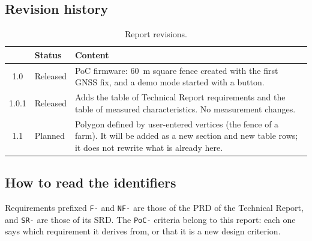 \subsection{Revision history}

\begin{table}[H]
\centering
\small
\begin{tabularx}{\textwidth}{|c l X|}
\hline
\tablehead{\textbf{Rev.} & \textbf{Status} & \textbf{Content}} \\ \hline
1.0 & Released & PoC firmware: 60~m square fence created with the first GNSS fix, and a demo mode started with a button. \\ \hline
1.0.1 & Released & Adds the table of Technical Report requirements and the table of measured characteristics. No measurement changes. \\ \hline
1.1 & Planned & Polygon defined by user-entered vertices (the fence of a farm). It will be added as a new section and new table rows; it does not rewrite what is already here. \\ \hline
\end{tabularx}
\caption{Report revisions.}
\end{table}

\subsection{How to read the identifiers}

Requirements prefixed \texttt{F-} and \texttt{NF-} are those of the PRD of the Technical Report, and
\texttt{SR-} are those of its SRD. The \texttt{PoC-} criteria belong to this report: each one says which
requirement it derives from, or that it is a new design criterion.
